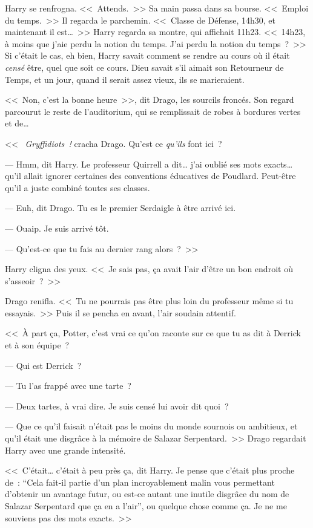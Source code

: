 Harry se renfrogna. <<~Attends.~>> Sa main passa dans sa bourse. <<~Emploi du temps.~>> Il regarda le parchemin. <<~Classe de Défense, 14h30, et maintenant il est…~>> Harry regarda sa montre, qui affichait 11h23. <<~14h23, à moins que j'aie perdu la notion du temps. J'ai perdu la notion du temps~?~>> Si c'était le cas, eh bien, Harry savait comment se rendre au cours où il était \emph{censé} être, quel que soit ce cours. Dieu savait s'il aimait son Retourneur de Temps, et un jour, quand il serait assez vieux, ils se marieraient.

<<~Non, c'est la bonne heure~>>, dit Drago, les sourcils froncés. Son regard parcourut le reste de l'auditorium, qui se remplissait de robes à bordures vertes et de…

<<~ \emph{Gryffidiots~!} cracha Drago. Qu'est ce \emph{qu'ils} font ici~?

--- Hmm, dit Harry. Le professeur Quirrell a dit… j'ai oublié ses mots exacts… qu'il allait ignorer certaines des conventions éducatives de Poudlard. Peut-être qu'il a juste combiné toutes ses classes.

--- Euh, dit Drago. Tu es le premier Serdaigle à être arrivé ici.

--- Ouaip. Je suis arrivé tôt.

--- Qu'est-ce que tu fais au dernier rang alors~?~>>

Harry cligna des yeux. <<~Je sais pas, ça avait l'air d'être un bon endroit où s'asseoir~?~>>

Drago renifla. <<~Tu ne pourrais pas être plus loin du professeur même si tu essayais.~>> Puis il se pencha en avant, l'air soudain attentif.

<<~À part ça, Potter, c'est vrai ce qu'on raconte sur ce que tu as dit à Derrick et à son équipe~?

--- Qui est Derrick~?

--- Tu l'as frappé avec une tarte~?

--- Deux tartes, à vrai dire. Je suis censé lui avoir dit quoi~?

--- Que ce qu'il faisait n'était pas le moins du monde sournois ou ambitieux, et qu'il était une disgrâce à la mémoire de Salazar Serpentard.~>> Drago regardait Harry avec une grande intensité.

<<~C'était… c'était à peu près ça, dit Harry. Je pense que c'était plus proche de~: “Cela fait-il partie d'un plan incroyablement malin vous permettant d'obtenir un avantage futur, ou est-ce autant une inutile disgrâce du nom de Salazar Serpentard que ça en a l'air”, ou quelque chose comme ça. Je ne me souviens pas des mots exacts.~>>

